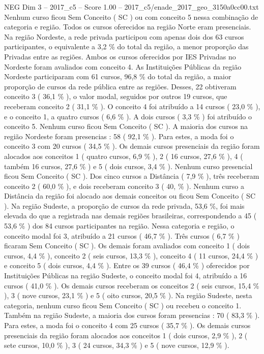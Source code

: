 \begin{textsample}{NEG Dim 3 – 2017\_c5 – Score 1.00 – 2017\_c5/enade\_2017\_geo\_3150a0cc00.txt}
Nenhum curso ficou Sem Conceito ( SC ) ou com conceito 5 nessa combinação de categoria e região.
Todos os cursos oferecidos na região Norte eram presenciais.
Na região Nordeste, a rede privada participou com apenas dois dos 63 cursos participantes, o equivalente a 3,2 \% do total da região, a menor proporção das Privadas entre as regiões.
Ambos os cursos oferecidos por IES Privadas no Nordeste foram avaliados com conceito 4.
As Instituições Públicas da região Nordeste participaram com 61 cursos, 96,8 \% do total da região, a maior proporção de cursos da rede pública entre as regiões.
Desses, 22 obtiveram conceito 3 ( 36,1 \% ), o valor modal, seguidos por outros 19 cursos, que receberam conceito 2 ( 31,1 \% ).
O conceito 4 foi atribuído a 14 cursos ( 23,0 \% ), e o conceito 1, a quatro cursos ( 6,6 \% ).
A dois cursos ( 3,3 \% ) foi atribuído o conceito 5.
Nenhum curso ficou Sem Conceito ( SC ).
A maioria dos cursos na região Nordeste foram presencias : 58 ( 92,1 \% ).
Para estes, a moda foi o conceito 3 com 20 cursos ( 34,5 \% ).
Os demais cursos presenciais da região foram alocados aos conceitos 1 ( quatro cursos, 6,9 \% ), 2 ( 16 cursos, 27,6 \% ), 4 ( também 16 cursos, 27,6 \% ) e 5 ( dois cursos, 3,4 \% ).
Nenhum curso presencial ficou Sem Conceito ( SC ).
Dos cinco cursos a Distância ( 7,9 \% ), três receberam conceito 2 ( 60,0 \% ), e dois receberam conceito 3 ( 40, \% ).
Nenhum curso a Distância da região foi alocado aos demais conceitos ou ficou Sem Conceito ( SC ).
Na região Sudeste, a proporção de cursos da rede privada, 53,6 \%, foi mais elevada do que a registrada nas demais regiões brasileiras, correspondendo a 45 ( 53,6 \% ) dos 84 cursos participantes na região.
Nessa categoria e região, o conceito modal foi 3, atribuído a 21 cursos ( 46,7 \% ).
Três cursos ( 6,7 \% ) ficaram Sem Conceito ( SC ).
Os demais foram avaliados com conceito 1 ( dois cursos, 4,4 \% ), conceito 2 ( seis cursos, 13,3 \% ), conceito 4 ( 11 cursos, 24,4 \% ) e conceito 5 ( dois cursos, 4,4 \% ).
Entre os 39 cursos ( 46,4 \% ) oferecidos por Instituições Públicas na região Sudeste, o conceito modal foi 4, atribuído a 16 cursos ( 41,0 \% ).
Os demais cursos receberam os conceitos 2 ( seis cursos, 15,4 \% ), 3 ( nove cursos, 23,1 \% ) e 5 ( oito cursos, 20,5 \% ).
Na região Sudeste, nesta categoria, nenhum curso ficou Sem Conceito ( SC ) ou recebeu o conceito 1.
Também na região Sudeste, a maioria dos cursos foram presencias : 70 ( 83,3 \% ).
Para estes, a moda foi o conceito 4 com 25 cursos ( 35,7 \% ).
Os demais cursos presenciais da região foram alocados aos conceitos 1 ( dois cursos, 2,9 \% ), 2 ( sete cursos, 10,0 \% ), 3 ( 24 cursos, 34,3 \% ) e 5 ( nove cursos, 12,9 \% ).

\end{textsample}

